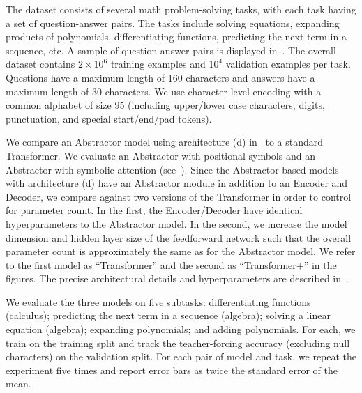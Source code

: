 The dataset consists of several math problem-solving tasks, with each task having a set of question-answer pairs. The tasks include solving equations, expanding products of polynomials, differentiating functions, predicting the next term in a sequence, etc. A sample of question-answer pairs is displayed in~. The overall dataset contains $2 \times 10^6$ training examples and $10^4$ validation examples per task. Questions have a maximum length of 160 characters and answers have a maximum length of 30 characters. We use character-level encoding with a common alphabet of size $95$ (including upper/lower case characters, digits, punctuation, and special start/end/pad tokens). %

We compare an Abstractor model using architecture (d) in~ to a standard Transformer. We evaluate an Abstractor with positional symbols and an Abstractor with symbolic attention (see~). Since the Abstractor-based models with architecture (d) have an Abstractor module in addition to an Encoder and Decoder, we compare against two versions of the Transformer in order to control for parameter count. In the first, the Encoder/Decoder have identical hyperparameters to the Abstractor model. In the second, we increase the model dimension and hidden layer size of the feedforward network such that the overall parameter count is approximately the same as for the Abstractor model. We refer to the first model as ``Transformer'' and the second as ``Transformer+'' in the figures. %
The precise architectural details and hyperparameters are described in~.


We evaluate the three models on five subtasks: differentiating functions (calculus); predicting the next term in a sequence (algebra); solving a linear equation (algebra); expanding polynomials; and adding polynomials. For each, we train on the training split and track the teacher-forcing accuracy (excluding null characters) on the validation split. For each pair of model and task, we repeat the experiment five times and report error bars as twice the standard error of the mean.

